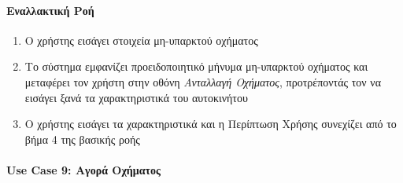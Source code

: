 \documentclass{../ol-softwaremanual}
\begin{document}
	\paragraph{{Εναλλακτική Ροή}}
	
	\begin{enumerate}
		\item Ο χρήστης εισάγει στοιχεία μη-υπαρκτού οχήματος
		\item Το σύστημα εμφανίζει προειδοποιητικό μήνυμα μη-υπαρκτού οχήματος και μεταφέρει τον χρήστη στην οθόνη \textit{Ανταλλαγή Οχήματος}, προτρέποντάς τον να εισάγει ξανά τα χαρακτηριστικά του αυτοκινήτου
		\item Ο χρήστης εισάγει τα χαρακτηριστικά και η Περίπτωση Χρήσης συνεχίζει από το βήμα 4 της βασικής ροής
	\end{enumerate}
	
	
	\paragraph{\en Use Case 9: \gr Αγορά Οχήματος\gr}
	
\end{document}
